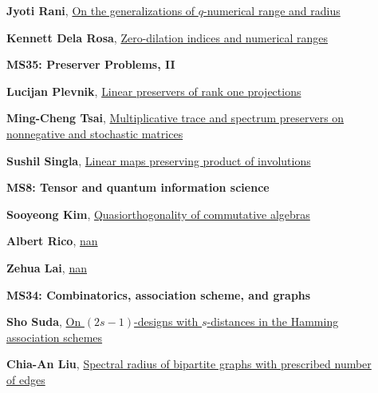 \documentclass[ILAS2025-program.tex]{subfiles}
\begin{document}
\begin{description}
\begin{description}
        \item[] \hypertarget{up0278}{}\textbf{Jyoti Rani}, \hyperlink{down0278}{On the generalizations of $q$-numerical range and radius}
        \item[] \hypertarget{up0279}{}\textbf{Kennett Dela Rosa}, \hyperlink{down0279}{Zero-dilation indices and numerical ranges}
        \end{description}
    \begin{description}
    \item[] {\color{mstitle}\textbf{MS35: Preserver Problems, II}} 
    \item[] \hypertarget{up0280}{}\textbf{Lucijan Plevnik}, \hyperlink{down0280}{Linear preservers of rank one projections}
        \item[] \hypertarget{up0281}{}\textbf{Ming-Cheng Tsai}, \hyperlink{down0281}{Multiplicative trace and spectrum preservers  on   nonnegative and stochastic matrices
}
        \item[] \hypertarget{up0282}{}\textbf{Sushil Singla}, \hyperlink{down0282}{Linear maps preserving product of involutions}
        \end{description}
    \begin{description}
    \item[] {\color{mstitle}\textbf{MS8: Tensor and quantum information science}} 
    \item[] \hypertarget{up0283}{}\textbf{Sooyeong Kim}, \hyperlink{down0283}{Quasiorthogonality of commutative algebras
}
        \item[] \hypertarget{up0284}{}\textbf{Albert Rico}, \hyperlink{down0284}{nan}
        \item[] \hypertarget{up0285}{}\textbf{Zehua Lai}, \hyperlink{down0285}{nan}
        \end{description}
    \begin{description}
    \item[] {\color{mstitle}\textbf{MS34: Combinatorics, association scheme, and graphs}} 
    \item[] \hypertarget{up0286}{}\textbf{Sho Suda}, \hyperlink{down0286}{On $(2s-1)$-designs with $s$-distances in the Hamming association schemes
}
        \item[] \hypertarget{up0287}{}\textbf{Chia-An Liu}, \hyperlink{down0287}{Spectral radius of bipartite graphs with prescribed number of edges}

\end{description}
\end{description}
\end{document}
